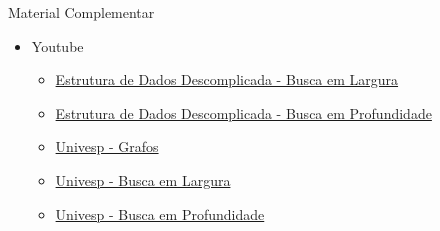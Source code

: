 \documentclass{beamer}
\begin{document}
\begin{frame}{Material Complementar}
   \begin{itemize}
	\item Youtube
	\begin{itemize}
   \item \href{https://www.youtube.com/watch?v=jWoP1fTTDzE}{Estrutura de Dados Descomplicada - Busca em Largura}      
   \item \href{https://www.youtube.com/watch?v=pJ3ilnhXWCQ}{Estrutura de Dados Descomplicada - Busca em Profundidade}   	
   \item \href{https://www.youtube.com/watch?v=MC0u4f334mI}{Univesp - Grafos}   
   \item \href{https://www.youtube.com/watch?v=9J3Sz6K--8c}{Univesp - Busca em Largura}      
   \item \href{https://www.youtube.com/watch?v=doH9o1sO-Cw}{Univesp - Busca em Profundidade}         
	\end{itemize}		
   \end{itemize}
\end{frame}    
\end{document}
